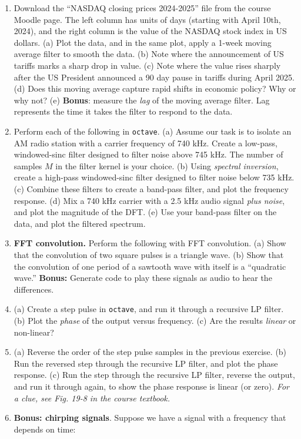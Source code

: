 \documentclass{article}
\begin{document}
\begin{enumerate}
\item Download the ``NASDAQ closing prices 2024-2025'' file from the course Moodle page.  The left column has units of days (starting with April 10th, 2024), and the right column is the value of the NASDAQ stock index in US dollars. (a) Plot the data, and in the same plot, apply a 1-week moving average filter to smooth the data.  (b) Note where the announcement of US tariffs marks a sharp drop in value. (c) Note where the value rises sharply after the US President announced a 90 day pause in tariffs during April 2025. (d) Does this moving average capture rapid shifts in economic policy?  Why or why not?  (e) \textbf{Bonus}: measure the \textit{lag} of the moving average filter.  Lag represents the time it takes the filter to respond to  the data. \\
\item Perform each of the following in \verb+octave+.  (a) Assume our task is to isolate an AM radio station with a carrier frequency of 740 kHz.  Create a low-pass, windowed-sinc filter designed to filter noise above 745 kHz. The number of samples $M$ in the filter kernel is your choice. (b) Using \textit{spectral inversion}, create a high-pass windowed-sinc filter designed to filter noise below 735 kHz.  (c) Combine these filters to create a band-pass filter, and plot the frequency response. (d) Mix a 740 kHz carrier with a 2.5 kHz audio signal \textit{plus noise}, and plot the magnitude of the DFT.  (e) Use your band-pass filter on the data, and plot the filtered spectrum.
\item \textbf{FFT convolution.} Perform the following with FFT convolution. (a) Show that the convolution of two square pulses is a triangle wave. (b) Show that the convolution of one period of a sawtooth wave with itself is a ``quadratic wave.''  \textbf{Bonus:} Generate code to play these signals as audio to hear the differences.
\item (a) Create a step pulse in \verb+octave+, and run it through a recursive LP filter. (b) Plot the \textit{phase} of the output versus frequency. (c) Are the results \textit{linear} or non-linear?
\item (a) Reverse the order of the step pulse samples in the previous exercise.  (b) Run the reversed step through the recursive LP filter, and plot the phase response.  (c) Run the step through the recursive LP filter, reverse the output, and run it through again, to show the phase response is linear (or zero).  \textit{For a clue, see Fig. 19-8 in the course textbook.}
\item \textbf{Bonus: chirping signals}.  Suppose we have a signal with a frequency that depends on time:

\end{enumerate}
\end{document}
